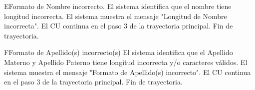 \begin{UCtrayectoriaA}{E}{Formato de Nombre incorrecto.}
	\UCpaso El sistema identifica que el nombre tiene longitud incorrecta.
	\UCpaso El sistema muestra el mensaje "Longitud de Nombre incorrecta".
	\UCpaso El CU continua en el paso 3 de la trayectoria principal.
	\UCpaso Fin de trayectoria.
\end{UCtrayectoriaA}

\begin{UCtrayectoriaA}{F}{Formato de Apellido(s) incorrecto(s)}
	\UCpaso El sistema identifica que el Apellido Materno y Apellido Paterno tiene longitud incorrecta y/o caracteres válidos.
	\UCpaso El sistema muestra el mensaje "Formato de Apellido(s) incorrecto".
	\UCpaso El CU continua en el paso 3 de la trayectoria principal.
	\UCpaso Fin de trayectoria.
\end{UCtrayectoriaA}

		
